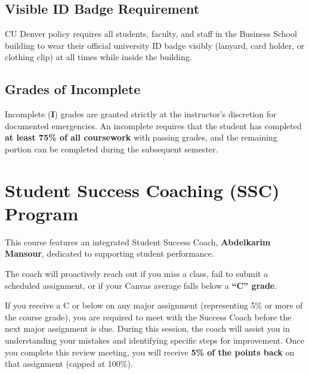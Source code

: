 \documentclass[11pt,a4paper]{article}
\begin{document}
\subsection*{Visible ID Badge Requirement}
CU Denver policy requires all students, faculty, and staff in the Business School building to wear their official university ID badge visibly (lanyard, card holder, or clothing clip) at all times while inside the building.

\subsection*{Grades of Incomplete}
Incomplete (\textbf{I}) grades are granted strictly at the instructor's discretion for documented emergencies. An incomplete requires that the student has completed \textbf{at least 75\% of all coursework} with passing grades, and the remaining portion can be completed during the subsequent semester.

\section*{Student Success Coaching (SSC) Program}
This course features an integrated Student Success Coach, \textbf{Abdelkarim Mansour}, dedicated to supporting student performance.

The coach will proactively reach out if you miss a class, fail to submit a scheduled assignment, or if your Canvas average falls below a \textbf{``C'' grade}. 

If you receive a C or below on any major assignment (representing 5\% or more of the course grade), you are required to meet with the Success Coach before the next major assignment is due. During this session, the coach will assist you in understanding your mistakes and identifying specific steps for improvement. Once you complete this review meeting, you will receive \textbf{5\% of the points back} on that assignment (capped at 100\%).
\end{document}
